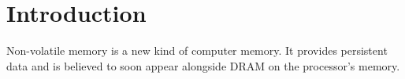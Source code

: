 
\chapter{Introduction}

Non-volatile memory is a new kind of computer memory. It provides persistent data and is believed to soon appear alongside DRAM on the processor's memory. 






